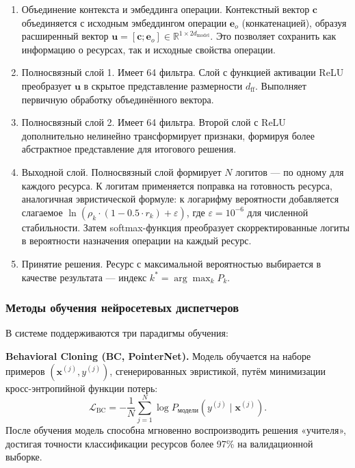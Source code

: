 \begin{enumerate}
\item Объединение контекста и эмбеддинга операции. Контекстный вектор $\mathbf{c}$ объединяется с исходным эмбеддингом операции $\mathbf{e}_o$ (конкатенацией), образуя расширенный вектор $\mathbf{u} = [\mathbf{c}; \mathbf{e}_o] \in \mathbb{R}^{1 \times 2d_{\text{model}}}$. Это позволяет сохранить как информацию о ресурсах, так и исходные свойства операции.

\item Полносвязный слой 1. Имеет 64 фильтра. Слой с функцией активации ReLU преобразует $\mathbf{u}$ в скрытое представление размерности $d_{\text{ff}}$. Выполняет первичную обработку объединённого вектора.

\item Полносвязный слой 2. Имеет 64 фильтра. Второй слой с ReLU дополнительно нелинейно трансформирует признаки, формируя более абстрактное представление для итогового решения.

\item Выходной слой. Полносвязный слой формирует $N$ логитов — по одному для каждого ресурса. К логитам применяется поправка на готовность ресурса, аналогичная эвристической формуле: к логарифму вероятности добавляется слагаемое $\ln(\rho_k \cdot (1 - 0.5 \cdot r_k) + \varepsilon)$, где $\varepsilon = 10^{-6}$ для численной стабильности. Затем softmax-функция преобразует скорректированные логиты в вероятности назначения операции на каждый ресурс.

\item Принятие решения. Ресурс с максимальной вероятностью выбирается в качестве результата — индекс $k^* = \arg\max_k P_k$.
\end{enumerate}

\subsubsection{Методы обучения нейросетевых диспетчеров}

В системе поддерживаются три парадигмы обучения:

\textbf{Behavioral Cloning (BC, PointerNet).} Модель обучается на наборе примеров $(\mathbf{x}^{(j)}, y^{(j)})$, сгенерированных эвристикой, путём минимизации кросс-энтропийной функции потерь:
\begin{equation}
    \mathcal{L}_{\text{BC}} = -\frac{1}{N}\sum_{j=1}^{N} \log P_{\text{модели}}(y^{(j)} \mid \mathbf{x}^{(j)}).
\end{equation}
После обучения модель способна мгновенно воспроизводить решения «учителя», достигая точности классификации ресурсов более 97\% на валидационной выборке.

